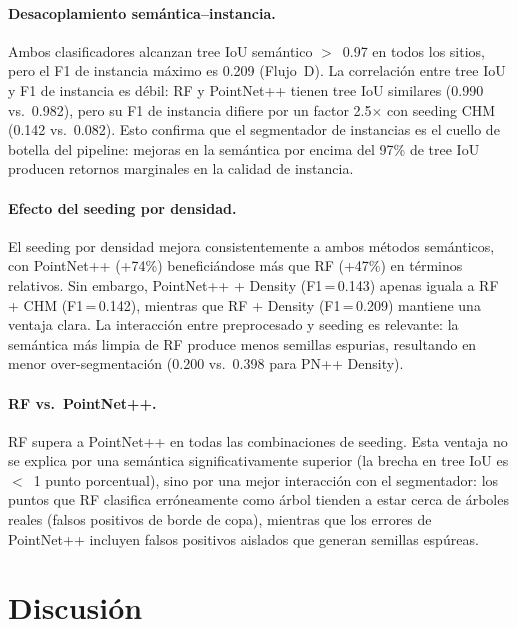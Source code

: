 \documentclass[runningheads]{llncs}
\begin{document}
\paragraph{Desacoplamiento sem\'antica--instancia.}
Ambos clasificadores alcanzan tree IoU sem\'antico $>$~0.97 en todos los sitios, pero el F1 de instancia m\'aximo es 0.209 (Flujo~D). La correlaci\'on entre tree IoU y F1 de instancia es d\'ebil: RF y PointNet++ tienen tree IoU similares (0.990 vs.\ 0.982), pero su F1 de instancia difiere por un factor 2.5$\times$ con seeding CHM (0.142 vs.\ 0.082). Esto confirma que el segmentador de instancias es el cuello de botella del pipeline: mejoras en la sem\'antica por encima del 97\% de tree IoU producen retornos marginales en la calidad de instancia.

\paragraph{Efecto del seeding por densidad.}
El seeding por densidad mejora consistentemente a ambos m\'etodos sem\'anticos, con PointNet++ (+74\%) benefici\'andose m\'as que RF (+47\%) en t\'erminos relativos. Sin embargo, PointNet++ + Density (F1\,=\,0.143) apenas iguala a RF + CHM (F1\,=\,0.142), mientras que RF + Density (F1\,=\,0.209) mantiene una ventaja clara. La interacci\'on entre preprocesado y seeding es relevante: la sem\'antica m\'as limpia de RF produce menos semillas espurias, resultando en menor over-segmentaci\'on (0.200 vs.\ 0.398 para PN++ Density).

\paragraph{RF vs.\ PointNet++.}
RF supera a PointNet++ en todas las combinaciones de seeding. Esta ventaja no se explica por una sem\'antica significativamente superior (la brecha en tree IoU es $<$~1 punto porcentual), sino por una mejor interacci\'on con el segmentador: los puntos que RF clasifica err\'oneamente como \'arbol tienden a estar cerca de \'arboles reales (falsos positivos de borde de copa), mientras que los errores de PointNet++ incluyen falsos positivos aislados que generan semillas esp\'ureas.

\section{Discusi\'on}\label{sec:discussion}
\end{document}
